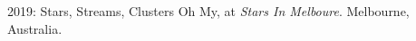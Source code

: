 \item[{\color{numcolor}\scriptsize1}] 2019: Stars, Streams, Clusters Oh My, at \textit{Stars In Melboure}. Melbourne, Australia.
